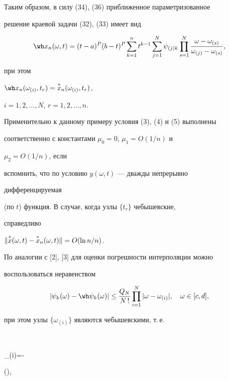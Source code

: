 Таким образом, в силу (34), (36) приближенное параметризованное


решение краевой задачи (32), (33) имеет вид


\begin{equation}


\wh x_n(\omega,t)=(t-a)^P(b-t)^P


\sum^n_{k=1}t^{k-1}\sum^N_{j=1}\psi_{(j)k}\prod^N_{s=1}


\frac{\omega-\omega_{(s)}}{\omega_{(j)}-\omega_{(s)}},


\end{equation}


при этом


$\wh x_n(\omega_{(i)},t_r)=\up{*}{x}_n(\omega_{(i)},t_r)$,


$i=1,2,\dotsc,N$, $r=1,2,\dotsc,n$.





Применительно к данному примеру условия (3), (4) и (5) выполнены


соответственно с константами $\mu_0=0$, $\mu_1=O(1/n)$ и


$\mu_2=O(1/n)$, если


вспомнить, что по условию $y(\omega,t)$ --- дважды непрерывно


дифференцируемая


(по $t$) функция. В случае, когда узлы $\{t_r\}$ чебышевские,


справедливо


$\|\overset{*}{x}{}(\omega,t)-\overset{*}{x}{}_n(\omega,t)\|=O(\ln n/n)$.





По аналогии с [2], [3] для оценки погрешности интерполяции можно


воспользоваться неравенством


\begin{equation}


|\psi_k(\omega)-\wh\psi_k(\omega)|\le\frac{Q_N}{N\,!}


\prod^N_{i=1}|\omega-\omega_{(i)}|,\quad \omega\in[c,d],


\end{equation}


при этом узлы $\{\omega_{(i)}\}$ являются чебышевскими, т.\,е.


$$


\omega_{(i)}=-\cos


\biggl(\pi\biggr),


